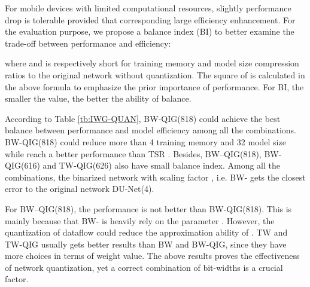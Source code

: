 \documentclass[runningheads]{llncs}
\begin{document}
For mobile devices with limited computational resources, slightly performance drop is tolerable provided that corresponding large efficiency enhancement. For the evaluation purpose, we propose a balance index (BI) to better examine the trade-off between performance and efficiency: 
 
where  and  is respectively short for training memory and model size compression ratios to the original network without quantization. The square of  is calculated in the above formula to emphasize the prior importance of performance. For BI, the smaller the value, the better the ability of balance.

According to Table \ref{tb:IWG-QUAN}, BW-QIG(818) could achieve the best balance between performance and model efficiency among all the combinations. BW-QIG(818) could reduce more than 4 training memory and 32 model size while reach a better performance than TSR \cite{lv2017deep}. Besides, BW--QIG(818),  BW-QIG(616) and TW-QIG(626) also have small balance index. Among all the combinations, the binarized network with scaling factor , i.e. BW- gets the closest error to the original network DU-Net(4).


For BW--QIG(818), the performance is not better than BW-QIG(818). This is mainly because that BW- is heavily rely on the parameter . However, the quantization of dataflow could reduce the approximation ability of . TW and TW-QIG usually gets better results than BW and BW-QIG, since they have more choices in terms of weight value. The above results proves the effectiveness of network quantization, yet a correct combination of bit-widths is a crucial factor.
\end{document}
